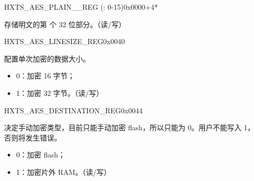 

\begin{register}{H}{XTS\_AES\_PLAIN\_\_REG (: 0-15)}{0x0000+4*}\label{regdesc:XTSAESPLAINNREG}
%
\regnewline%
\begin{regdesc}\begin{reglist}
\label{fielddesc:XTSAESPLAINN}\item [XTS\_AES\_PLAIN\_\regindex{n}] 存储明文的第  个 32 位部分。（读/写）
\end{reglist}\end{regdesc}
\end{register}



\begin{register}{H}{XTS\_AES\_LINESIZE\_REG}{0x0040}\label{regdesc:XTSAESLINESIZEREG}
%
%
\regnewline%
\begin{regdesc}\begin{reglist}
\item [XTS\_AES\_LINESIZE] 配置单次加密的数据大小。
    \begin{itemize}
        \item 0：加密 16 字节；
        \item 1：加密 32 字节。（读/写）
    \end{itemize}
\end{reglist}\end{regdesc}
\end{register}


\begin{register}{H}{XTS\_AES\_DESTINATION\_REG}{0x0044}\label{regdesc:XTSAESDESTINATIONREG}
%
%
\regnewline%
\begin{regdesc}\begin{reglist}
\item [XTS\_AES\_DESTINATION] 决定手动加密类型，目前只能手动加密 flash，所以只能为 0。用户不能写入 1，否则将发生错误。
    \begin{itemize}
        \item 0：加密 flash；
        \item 1：加密片外 RAM。（读/写）
    \end{itemize}

\end{reglist}\end{regdesc}
\end{register}



